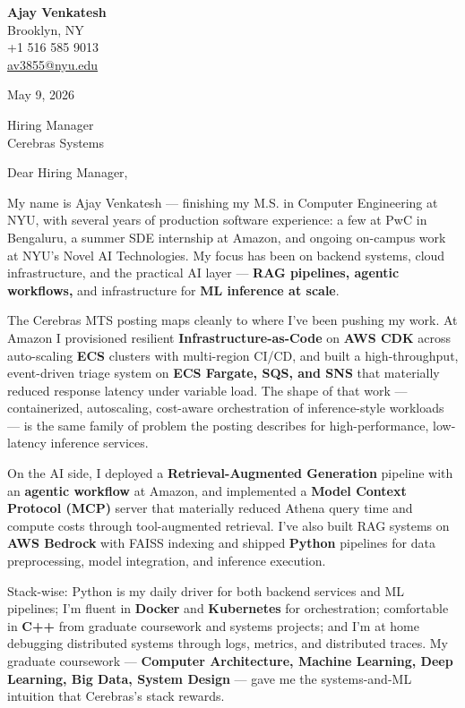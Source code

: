 \documentclass[letterpaper,11pt]{article}
\begin{document}
\begin{flushleft}
\textbf{\large Ajay Venkatesh} \\
Brooklyn, NY \\
+1 516 585 9013 \\
\href{mailto:av3855@nyu.edu}{av3855@nyu.edu}
\end{flushleft}

\vspace{10pt}

May 9, 2026

\vspace{6pt}

Hiring Manager \\
Cerebras Systems

\vspace{10pt}

Dear Hiring Manager,

My name is Ajay Venkatesh --- finishing my M.S. in Computer Engineering at NYU, with several years of production software experience: a few at PwC in Bengaluru, a summer SDE internship at Amazon, and ongoing on-campus work at NYU's Novel AI Technologies. My focus has been on backend systems, cloud infrastructure, and the practical AI layer --- \textbf{RAG pipelines, agentic workflows,} and infrastructure for \textbf{ML inference at scale}.

The Cerebras MTS posting maps cleanly to where I've been pushing my work. At Amazon I provisioned resilient \textbf{Infrastructure-as-Code} on \textbf{AWS CDK} across auto-scaling \textbf{ECS} clusters with multi-region CI/CD, and built a high-throughput, event-driven triage system on \textbf{ECS Fargate, SQS, and SNS} that materially reduced response latency under variable load. The shape of that work --- containerized, autoscaling, cost-aware orchestration of inference-style workloads --- is the same family of problem the posting describes for high-performance, low-latency inference services.

On the AI side, I deployed a \textbf{Retrieval-Augmented Generation} pipeline with an \textbf{agentic workflow} at Amazon, and implemented a \textbf{Model Context Protocol (MCP)} server that materially reduced Athena query time and compute costs through tool-augmented retrieval. I've also built RAG systems on \textbf{AWS Bedrock} with FAISS indexing and shipped \textbf{Python} pipelines for data preprocessing, model integration, and inference execution.

Stack-wise: Python is my daily driver for both backend services and ML pipelines; I'm fluent in \textbf{Docker} and \textbf{Kubernetes} for orchestration; comfortable in \textbf{C++} from graduate coursework and systems projects; and I'm at home debugging distributed systems through logs, metrics, and distributed traces. My graduate coursework --- \textbf{Computer Architecture, Machine Learning, Deep Learning, Big Data, System Design} --- gave me the systems-and-ML intuition that Cerebras's stack rewards.
\end{document}
